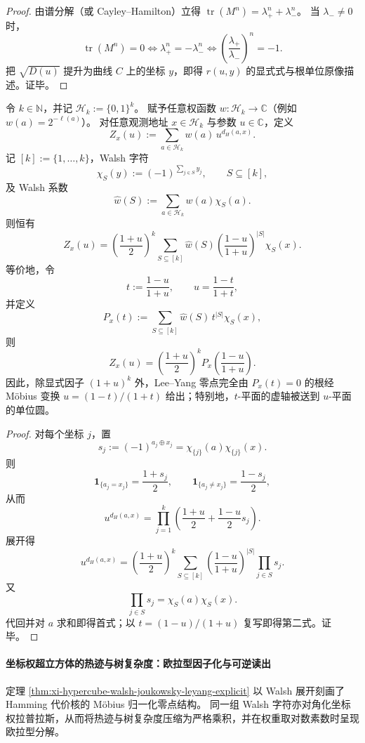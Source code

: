 \begin{proof}
由谱分解（或 Cayley--Hamilton）立得
\(
\operatorname{tr}(M^n)=\lambda_+^n+\lambda_-^n
\)。
当 \(\lambda_-\neq 0\) 时，
\[
\operatorname{tr}(M^n)=0
\iff
\lambda_+^n=-\lambda_-^n
\iff
\left(\frac{\lambda_+}{\lambda_-}\right)^n=-1.
\]
把 \(\sqrt{D(u)}\) 提升为曲线 \(C\) 上的坐标 \(y\)，即得 \(r(u,y)\) 的显式式与根单位原像描述。证毕。
\end{proof}

\begin{theorem}\label{thm:xi-hypercube-walsh-joukowsky-leyang-explicit}
令 \(k\in\mathbb N\)，并记 \(\mathcal H_k:=\{0,1\}^k\)。
赋予任意权函数 \(w:\mathcal H_k\to\mathbb C\)（例如 \(w(a)=2^{-\ell(a)}\)）。
对任意观测地址 \(x\in\mathcal H_k\) 与参数 \(u\in\mathbb C\)，定义
\[
Z_x(u):=\sum_{a\in\mathcal H_k}w(a)\,u^{d_H(a,x)}.
\]
记 \([k]:=\{1,\dots,k\}\)，Walsh 字符
\[
\chi_S(y):=(-1)^{\sum_{j\in S}y_j},
\qquad
S\subseteq[k],
\]
及 Walsh 系数
\[
\widehat w(S):=\sum_{a\in\mathcal H_k}w(a)\chi_S(a).
\]
则恒有
\[
Z_x(u)
=
\left(\frac{1+u}{2}\right)^k
\sum_{S\subseteq[k]}
\widehat w(S)
\left(\frac{1-u}{1+u}\right)^{|S|}
\chi_S(x).
\]
等价地，令
\[
t:=\frac{1-u}{1+u},
\qquad
u=\frac{1-t}{1+t},
\]
并定义
\[
P_x(t):=\sum_{S\subseteq[k]}\widehat w(S)\,t^{|S|}\chi_S(x),
\]
则
\[
Z_x(u)=\left(\frac{1+u}{2}\right)^k P_x\!\left(\frac{1-u}{1+u}\right).
\]
因此，除显式因子 \((1+u)^k\) 外，Lee--Yang 零点完全由 \(P_x(t)=0\) 的根经 Möbius 变换 \(u=(1-t)/(1+t)\) 给出；特别地，\(t\)-平面的虚轴被送到 \(u\)-平面的单位圆。
\end{theorem}

\begin{proof}
对每个坐标 \(j\)，置
\[
s_j:=(-1)^{a_j\oplus x_j}=\chi_{\{j\}}(a)\chi_{\{j\}}(x).
\]
则
\[
\mathbf 1_{\{a_j=x_j\}}=\frac{1+s_j}{2},
\qquad
\mathbf 1_{\{a_j\neq x_j\}}=\frac{1-s_j}{2},
\]
从而
\[
u^{d_H(a,x)}
=
\prod_{j=1}^k
\left(
\frac{1+u}{2}+\frac{1-u}{2}s_j
\right).
\]
展开得
\[
u^{d_H(a,x)}
=
\left(\frac{1+u}{2}\right)^k
\sum_{S\subseteq[k]}
\left(\frac{1-u}{1+u}\right)^{|S|}
\prod_{j\in S}s_j.
\]
又
\[
\prod_{j\in S}s_j=\chi_S(a)\chi_S(x).
\]
代回并对 \(a\) 求和即得首式；以 \(t=(1-u)/(1+u)\) 复写即得第二式。证毕。
\end{proof}



\paragraph{坐标权超立方体的热迹与树复杂度：欧拉型因子化与可逆读出}
定理 \ref{thm:xi-hypercube-walsh-joukowsky-leyang-explicit} 以 Walsh 展开刻画了 Hamming 代价核的 Möbius 归一化零点结构。
同一组 Walsh 字符亦对角化坐标权拉普拉斯，从而将热迹与树复杂度压缩为严格乘积，并在权重取对数素数时呈现欧拉型分解。

